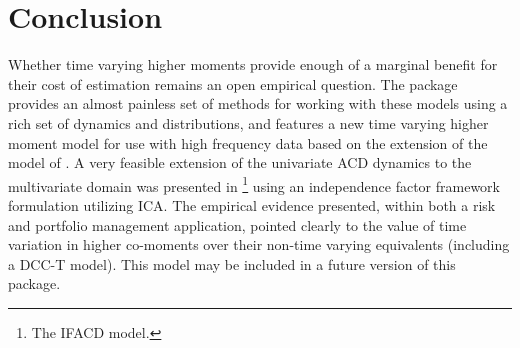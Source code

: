 \section{Conclusion}
Whether time varying higher moments provide enough of a marginal benefit for their cost of estimation remains an open empirical question. The \verb@racd@ package provides an almost painless set of methods for working with these models using a rich set of dynamics and distributions, and features a new time varying higher moment model for use with high frequency data based on the extension of the model of \citet{Engle2012}.
A very feasible extension of the univariate ACD dynamics to the multivariate domain was presented in \citet{Ghalanos2013}\footnote{The IFACD model.} using an independence factor framework formulation utilizing ICA. The empirical evidence presented, within both a risk and portfolio management application, pointed clearly to the value of time variation in higher co-moments over their non-time varying equivalents (including a DCC-T model). This model may be included in a future version of this package.
